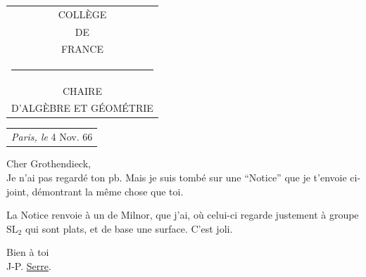\noindent\begin{tabular}[t]{c}
COLLÈGE\\
DE\\
FRANCE\\
\rule{1.8em}{0.5pt}\\
CHAIRE\\
D’ALGÈBRE ET GÉOMÉTRIE
\end{tabular}\hfill
\begin{tabular}[t]{l}
\textit{Paris, le} 4 Nov. 66\\
\end{tabular}

Cher Grothendieck,\\

Je n’ai pas regardé ton pb. Mais je suis tombé sur une ``Notice'' que je t’envoie ci-joint, démontrant la même chose que toi.

La Notice renvoie à un  de Milnor, que j’ai, où celui-ci regarde justement  à groupe $\mathrm{SL}_{2}$ qui sont plats, et de base une surface. C’est  joli.

Bien à toi\\
J-P. \uline{Serre}.\\
\clearpage
